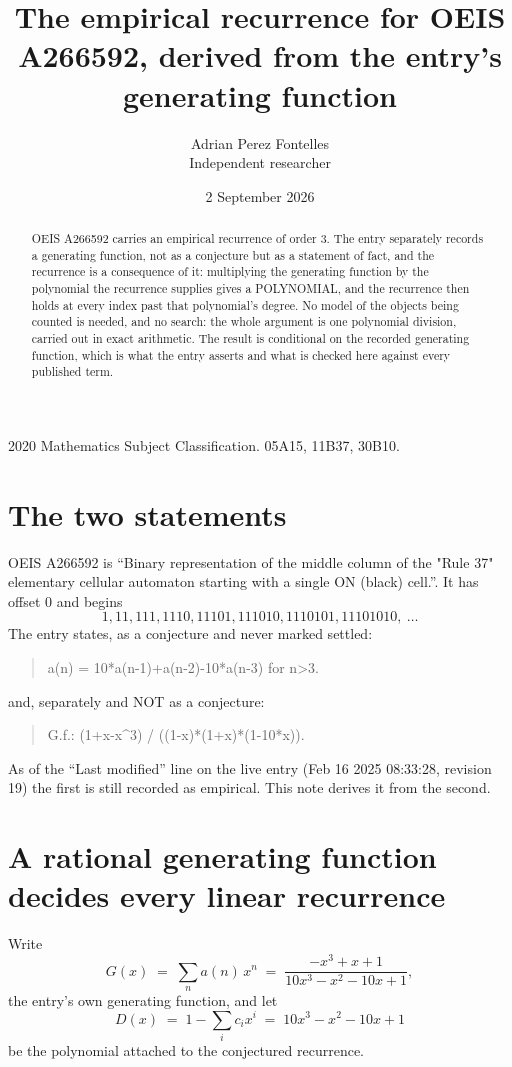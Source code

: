 \documentclass[11pt,a4paper]{article}
\title{The empirical recurrence for OEIS A266592, derived from the entry's generating function}
\author{Adrian Perez Fontelles\\ \small Independent researcher}
\date{2 September 2026}
\theoremstyle{plain}
\theoremstyle{definition}
\begin{document}
\maketitle

\begin{abstract}
OEIS A266592 carries an empirical recurrence of order $3$. The entry separately records a
generating function, not as a conjecture but as a statement of fact, and the recurrence is a
consequence of it: multiplying the generating function by the polynomial the recurrence
supplies gives a POLYNOMIAL, and the recurrence then holds at every index past that
polynomial's degree. No model of the objects being counted is needed, and no search: the
whole argument is one polynomial division, carried out in exact arithmetic. The result is
conditional on the recorded generating function, which is what the entry asserts and what is
checked here against every published term.
\end{abstract}

\noindent\small 2020 Mathematics Subject Classification. 05A15, 11B37, 30B10.\normalsize

\section{The two statements}

OEIS A266592 is ``Binary representation of the middle column of the "Rule 37" elementary cellular automaton starting with a single ON (black) cell.''. It has offset $0$ and begins
\[
1, 11, 111, 1110, 11101, 111010, 1110101, 11101010,\ \dots
\]
The entry states, as a conjecture and never marked settled:
\begin{quote}
a(n) = 10*a(n-1)+a(n-2)-10*a(n-3) for n>3.
\end{quote}
and, separately and NOT as a conjecture:
\begin{quote}
G.f.: (1+x-x\^{}3) / ((1-x)*(1+x)*(1-10*x)).
\end{quote}
As of the ``Last modified'' line on the live entry (Feb 16 2025 08:33:28, revision 19) the first is still
recorded as empirical. This note derives it from the second.

\section{A rational generating function decides every linear recurrence}

Write
\[
G(x)\;=\;\sum_{n}a(n)\,x^{n}\;=\;\frac{- x^{3} + x + 1}{10 x^{3} - x^{2} - 10 x + 1},
\]
the entry's own generating function, and let
\[
D(x)\;=\;1-\sum_i c_i x^{i}\;=\;10 x^{3} - x^{2} - 10 x + 1
\]
be the polynomial attached to the conjectured recurrence.
\end{document}
